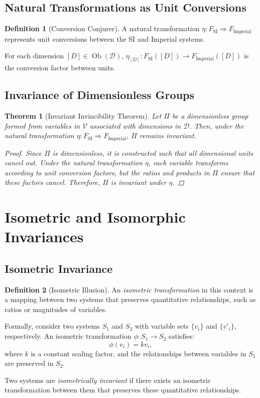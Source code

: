 \documentclass{article}
\newtheorem{theorem}{Theorem}[section]
\theoremstyle{definition}
\newtheorem{definition}{Definition}[section]
\theoremstyle{remark}
\begin{document}
	\subsection{Natural Transformations as Unit Conversions}
	
	\begin{definition}[Conversion Conjurer]
		A natural transformation $\eta: F_{\text{SI}} \Rightarrow F_{\text{Imperial}}$ represents unit conversions between the SI and Imperial systems.
		
		For each dimension $[D] \in \operatorname{Ob}(\mathcal{D})$, $\eta_{[D]}: F_{\text{SI}}([D]) \rightarrow F_{\text{Imperial}}([D])$ is the conversion factor between units.
	\end{definition}
	
	\subsection{Invariance of Dimensionless Groups}
	
	\begin{theorem}[Invariant Invincibility Theorem]
		Let $\Pi$ be a dimensionless group formed from variables in $\mathcal{V}$ associated with dimensions in $\mathcal{D}$. Then, under the natural transformation $\eta: F_{\text{SI}} \Rightarrow F_{\text{Imperial}}$, $\Pi$ remains invariant.
		
		\begin{proof}
			Since $\Pi$ is dimensionless, it is constructed such that all dimensional units cancel out. Under the natural transformation $\eta$, each variable transforms according to unit conversion factors, but the ratios and products in $\Pi$ ensure that these factors cancel. Therefore, $\Pi$ is invariant under $\eta$.
		\end{proof}
	\end{theorem}
	
	\section{Isometric and Isomorphic Invariances}
	
	\subsection{Isometric Invariance}
	
	\begin{definition}[Isometric Illusion]
		An \emph{isometric transformation} in this context is a mapping between two systems that preserves quantitative relationships, such as ratios or magnitudes of variables.
		
		Formally, consider two systems $S_1$ and $S_2$ with variable sets $\{v_i\}$ and $\{v'_i\}$, respectively. An isometric transformation $\phi: S_1 \rightarrow S_2$ satisfies:
		\[
		\phi(v_i) = k v_i,
		\]
		where $k$ is a constant scaling factor, and the relationships between variables in $S_1$ are preserved in $S_2$.
		
		Two systems are \emph{isometrically invariant} if there exists an isometric transformation between them that preserves these quantitative relationships.
	\end{definition}
	
\end{document}
